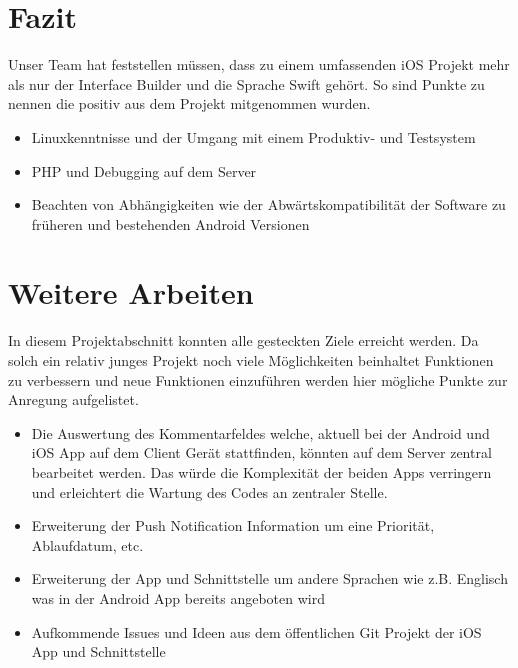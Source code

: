 \newpage

\section{Fazit}
Unser Team hat feststellen müssen, dass zu einem umfassenden iOS Projekt mehr als nur der Interface Builder und die Sprache Swift gehört. So sind Punkte zu nennen die positiv aus dem Projekt mitgenommen wurden.
\begin{itemize}
\item Linuxkenntnisse und der Umgang mit einem Produktiv- und Testsystem
\item PHP und Debugging auf dem Server
\item Beachten von Abhängigkeiten wie der Abwärtskompatibilität der Software zu früheren und bestehenden Android Versionen
\end{itemize}

\section{Weitere Arbeiten}
In diesem Projektabschnitt konnten alle gesteckten Ziele erreicht werden. Da solch ein relativ junges Projekt noch viele Möglichkeiten beinhaltet Funktionen zu verbessern und neue Funktionen einzuführen werden hier mögliche Punkte zur Anregung aufgelistet.

\begin{itemize}
\item Die Auswertung des Kommentarfeldes welche, aktuell bei der Android und iOS App auf dem Client Gerät stattfinden, könnten auf dem Server zentral bearbeitet werden. Das würde die Komplexität der beiden Apps verringern und erleichtert die Wartung des Codes an zentraler Stelle.
\item Erweiterung der Push Notification Information um eine Priorität, Ablaufdatum, etc.
\item Erweiterung der App und Schnittstelle um andere Sprachen wie z.B. Englisch was in der Android App bereits angeboten wird
\item Aufkommende Issues und Ideen aus dem öffentlichen Git Projekt der iOS App und Schnittstelle

\end{itemize}

